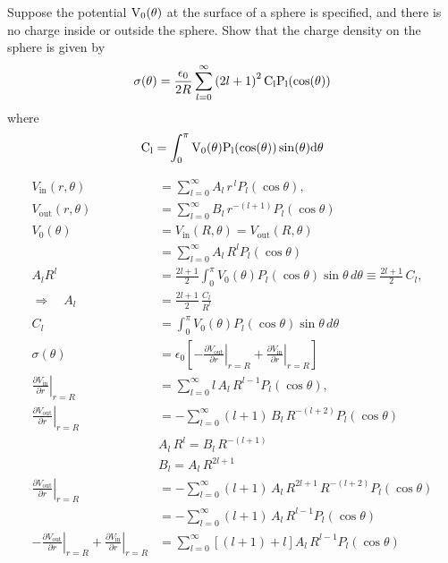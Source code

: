 \begin{hwkProblem}{3.20}{}

	Suppose the potential \( \func{V_{0}}[\theta] \) at the surface of a sphere is specified, and there is no charge inside or outside the sphere. Show that the charge density on the sphere is given by
	\[
		\func{\sigma}[\theta] = \frac{\epsilon_{0}}{2 R} \sum_{l=0}^{\infty}\left(2l+1\right)^{2}\func{C_{l}}\func{P_{l}}[\cos{\theta}]
	\]
	where
	\[
		\func{C_{l}} = \intdef{0}{\pi}{\func{V_{0}}[\theta]\func{P_{l}}[\cos{\theta}]\sin{\theta}}{\theta}
	\]

	\hwkSol{}

	\begin{align*}
		V_{\text{in}}(r,\theta) &= \sum_{l=0}^{\infty} A_{l}\, r^{\,l} P_{l}(\cos\theta), \\
		V_{\text{out}}(r,\theta) &= \sum_{l=0}^{\infty} B_{l}\, r^{-(l+1)} P_{l}(\cos\theta) \\
		V_{0}(\theta) &= V_{\text{in}}(R,\theta) = V_{\text{out}}(R,\theta) \\
		&=\sum_{l=0}^{\infty} A_{l}\, R^{l} P_{l}(\cos\theta) \\
		A_{l}R^{l} &= \frac{2l+1}{2} \int_{0}^{\pi}V_{0}(\theta) P_{l}(\cos\theta) \sin\theta\, d\theta \equiv \frac{2l+1}{2}\, C_{l}, \\
		\Rightarrow\quad A_{l} &= \frac{2l+1}{2}\, \frac{C_{l}}{R^{l}} \\
		C_{l} &= \int_{0}^{\pi}V_{0}(\theta) P_{l}(\cos\theta) \sin\theta\, d\theta \\
		\sigma(\theta) &= \epsilon_{0}\left[-\left.\frac{\partial V_{\text{out}}}{\partial r}\right|_{r=R} + \left.\frac{\partial V_{\text{in}}}{\partial r}\right|_{r=R}\right] \\
		\left.\frac{\partial V_{\text{in}}}{\partial r}\right|_{r=R} &= \sum_{l=0}^{\infty} l\, A_{l}\, R^{l-1} P_{l}(\cos\theta), \\
		\left.\frac{\partial V_{\text{out}}}{\partial r}\right|_{r=R} &= -\sum_{l=0}^{\infty} (l+1)\, B_{l}\, R^{-(l+2)} P_{l}(\cos\theta) \\
		& A_{l}\, R^{l} = B_{l}\, R^{-(l+1)} \\
		& B_{l} = A_{l}\, R^{2l+1} \\
		\left.\frac{\partial V_{\text{out}}}{\partial r}\right|_{r=R} 
		&= -\sum_{l=0}^{\infty} (l+1)\, A_{l}\, R^{2l+1}\, R^{-(l+2)} P_{l}(\cos\theta) \\
		&= -\sum_{l=0}^{\infty} (l+1)\, A_{l}\, R^{l-1} P_{l}(\cos\theta) \\
		-\left.\frac{\partial V_{\text{out}}}{\partial r}\right|_{r=R} + \left.\frac{\partial V_{\text{in}}}{\partial r}\right|_{r=R} &=\sum_{l=0}^{\infty} \left[(l+1) + l\right] A_{l}\, R^{l-1} P_{l}(\cos\theta) \\

\end{align*}
\end{hwkProblem}
